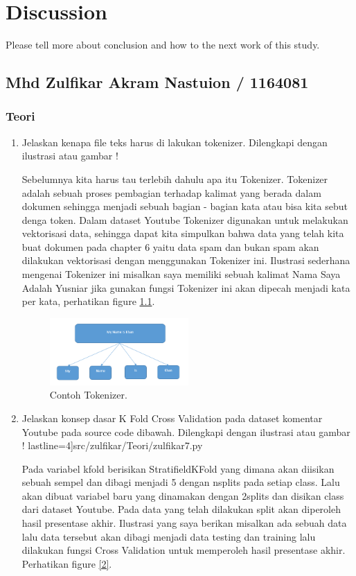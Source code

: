 \chapter{Discussion}
Please tell more about conclusion and how to the next work of this study.
\section{Mhd Zulfikar Akram Nastuion / 1164081}
\subsection{Teori}
\begin{enumerate}

\item Jelaskan kenapa file teks harus di lakukan tokenizer. Dilengkapi dengan ilustrasi atau gambar !
\par
Sebelumnya kita harus tau terlebih dahulu apa itu Tokenizer. Tokenizer adalah sebuah proses pembagian terhadap kalimat yang berada dalam dokumen sehingga menjadi sebuah bagian - bagian kata atau bisa kita sebut denga token. Dalam dataset Youtube Tokenizer digunakan untuk melakukan vektorisasi data, sehingga dapat kita simpulkan bahwa data yang telah kita buat dokumen pada chapter 6 yaitu data spam dan bukan spam akan dilakukan vektorisasi dengan menggunakan Tokenizer ini. Ilustrasi sederhana mengenai Tokenizer ini misalkan saya memiliki sebuah kalimat Nama Saya Adalah Yusniar jika gunakan fungsi Tokenizer ini akan dipecah menjadi kata per kata, perhatikan figure \ref{1}.

	\begin{figure}[!htbp!]
		\centerline{\includegraphics[width=0.5\textwidth]{figures/zulfikar/7/Teori/1164081_1.png}}
		\caption{Contoh Tokenizer.}
		\label{1}
	\end{figure}
\item Jelaskan konsep dasar K Fold Cross Validation pada dataset komentar Youtube pada source code dibawah. Dilengkapi dengan ilustrasi atau gambar !
	 lastline=4]{src/zulfikar/Teori/zulfikar7.py}
\par
Pada variabel kfold berisikan StratifieldKFold yang dimana akan diisikan sebuah sempel dan dibagi menjadi 5 dengan nsplits pada setiap class. Lalu akan dibuat variabel baru yang dinamakan dengan 2splits dan disikan class dari dataset Youtube. Pada data yang telah dilakukan split akan diperoleh hasil presentase akhir. Ilustrasi yang saya berikan misalkan ada sebuah data lalu data tersebut akan dibagi menjadi data testing dan training lalu dilakukan fungsi Cross Validation untuk memperoleh hasil presentase akhir. Perhatikan figure \ref{2}.


\end{enumerate}
